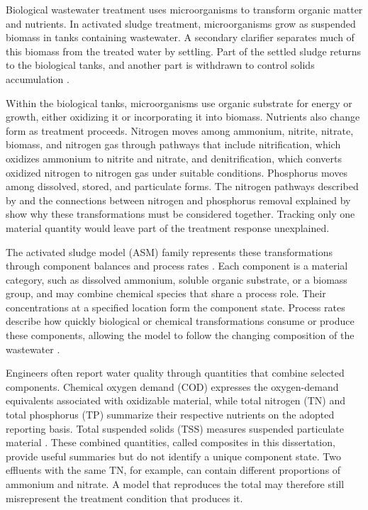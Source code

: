 Biological wastewater treatment uses microorganisms to transform organic matter and nutrients. In activated sludge treatment, microorganisms grow as suspended biomass in tanks containing wastewater. A secondary clarifier separates much of this biomass from the treated water by settling. Part of the settled sludge returns to the biological tanks, and another part is withdrawn to control solids accumulation \citep{Henze2008,Takacs1991}.

Within the biological tanks, microorganisms use organic substrate for energy or growth, either oxidizing it or incorporating it into biomass. Nutrients also change form as treatment proceeds. Nitrogen moves among ammonium, nitrite, nitrate, biomass, and nitrogen gas through pathways that include nitrification, which oxidizes ammonium to nitrite and nitrate, and denitrification, which converts oxidized nitrogen to nitrogen gas under suitable conditions. Phosphorus moves among dissolved, stored, and particulate forms. The nitrogen pathways described by \citet{Duan2022} and the connections between nitrogen and phosphorus removal explained by \citet{Wentzel1992} show why these transformations must be considered together. Tracking only one material quantity would leave part of the treatment response unexplained.

The activated sludge model (ASM) family represents these transformations through component balances and process rates \citep{Henze1987,Henze1999,Henze2006}. Each component is a material category, such as dissolved ammonium, soluble organic substrate, or a biomass group, and may combine chemical species that share a process role. Their concentrations at a specified location form the component state. Process rates describe how quickly biological or chemical transformations consume or produce these components, allowing the model to follow the changing composition of the wastewater \citep{Henze2006}.

Engineers often report water quality through quantities that combine selected components. Chemical oxygen demand (COD) expresses the oxygen-demand equivalents associated with oxidizable material, while total nitrogen (TN) and total phosphorus (TP) summarize their respective nutrients on the adopted reporting basis. Total suspended solids (TSS) measures suspended particulate material \citep{Henze2006,Henze2008}. These combined quantities, called composites in this dissertation, provide useful summaries but do not identify a unique component state. Two effluents with the same TN, for example, can contain different proportions of ammonium and nitrate. A model that reproduces the total may therefore still misrepresent the treatment condition that produces it.

